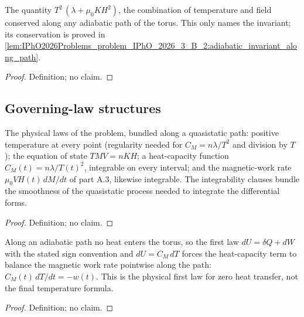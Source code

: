 \begin{definition}
\label{def:IPhO2026Problems_problem_IPhO_2026_3_B_2:adiabaticInvariant}
The quantity $T^2\,(\lambda + \mu_0 K H^2)$, the combination of temperature
and field conserved along any adiabatic path of the torus.  This only names
the invariant; its conservation is proved in
\cref{lem:IPhO2026Problems_problem_IPhO_2026_3_B_2:adiabatic_invariant_along_path}.
\end{definition}
\begin{proof}
Definition; no claim.
\end{proof}

\subsection*{Governing-law structures}

\begin{definition}
\label{def:IPhO2026Problems_problem_IPhO_2026_3_B_2:ParamagneticTorusLaws}
The physical laws of the problem, bundled along a quasistatic path: positive
temperature at every point (regularity needed for $C_M = n\lambda/T^2$ and
division by $T$); the equation of state $T M V = n K H$; a heat-capacity
function $C_M(t) = n\lambda/T(t)^2$, integrable on every interval; and the
magnetic-work rate $\mu_0 V H(t)\,dM/dt$ of part A.3, likewise integrable.
The integrability clauses bundle the smoothness of the quasistatic process
needed to integrate the differential forms.
\end{definition}
\begin{proof}
Definition; no claim.
\end{proof}

\begin{definition}
\label{def:IPhO2026Problems_problem_IPhO_2026_3_B_2:IsAdiabaticPath}
Along an adiabatic path no heat enters the torus, so the first law
$dU = \delta Q + dW$ with the stated sign convention and $dU = C_M\,dT$
forces the heat-capacity term to balance the magnetic work rate pointwise
along the path: $C_M(t)\,dT/dt = -w(t)$.  This is the physical first law
for zero heat transfer, not the final temperature formula.
\end{definition}
\begin{proof}
Definition; no claim.
\end{proof}


